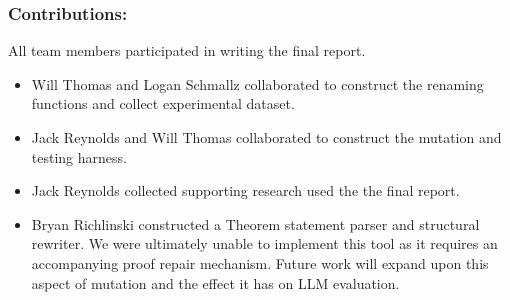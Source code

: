 \subsubsection{Contributions:}

All team members participated in writing the final report. 
\begin{itemize}
    \item  Will Thomas and Logan Schmallz collaborated to construct the renaming functions and collect experimental dataset.
    \item Jack Reynolds and Will Thomas collaborated to construct the mutation and testing harness.
    \item Jack Reynolds collected supporting research used the the final report.
    \item Bryan Richlinski constructed a Theorem statement parser and structural rewriter. We were ultimately unable to implement
    this tool as it requires an accompanying proof repair mechanism. 
    Future work will expand upon this aspect of mutation and the effect it has on LLM evaluation. 

\end{itemize}
